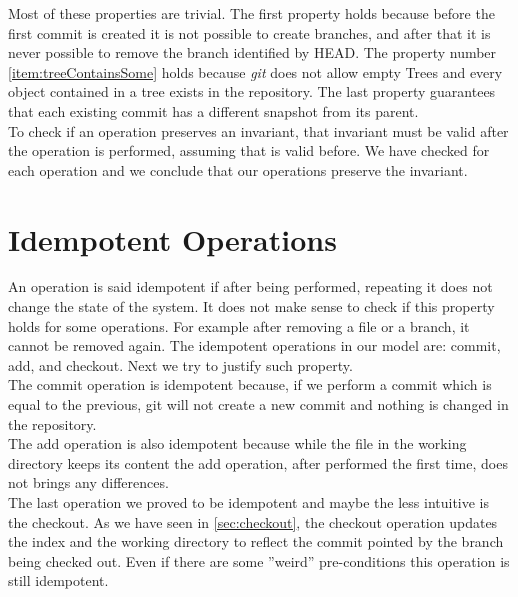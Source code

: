 Most of these properties are trivial. The first property holds
because before the first commit is created it is not possible to
create branches, and after that it is never possible to remove the branch
identified by HEAD. The property number 
\ref{item:treeContainsSome} holds because
\emph{git} does not allow empty Trees and every object contained in a
tree exists in the repository. The last property guarantees
that each existing commit has a different snapshot from its parent.\\

To check if an operation preserves an invariant, that invariant must
be valid after the operation is performed, assuming that is valid
before. We have checked for each operation and
we conclude that our operations preserve the invariant.


\section{Idempotent Operations}
An operation is said idempotent if after being performed, repeating it
does not change the state of the system. It does not make sense to
check if this property holds for some operations. For example after
removing a file or a branch, it cannot be removed again. The
idempotent operations in our model are: commit, add, and checkout.
Next we try to justify such property.\\

The commit operation is idempotent because, if we perform a commit which 
is equal to the previous, git will not create a new commit and nothing 
is changed in the repository.\\

The add operation is also idempotent because while the file in the
working directory keeps its content the add operation, after performed
the first time, does not brings any differences.\\

The last operation we proved to be idempotent and maybe the less
intuitive is the checkout. As we have seen in
\ref{sec:checkout}, the checkout operation updates the index and
the working directory to reflect the commit pointed by the branch being
checked out. Even if there are some ''weird'' pre-conditions this
operation is still idempotent.

